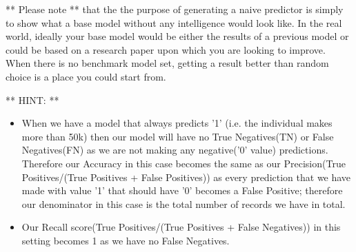 \documentclass[11pt]{article}
\providecommand{\tightlist}{%
      \setlength{\itemsep}{0pt}\setlength{\parskip}{0pt}}
\begin{document}
** Please note ** that the the purpose of generating a naive predictor
is simply to show what a base model without any intelligence would look
like. In the real world, ideally your base model would be either the
results of a previous model or could be based on a research paper upon
which you are looking to improve. When there is no benchmark model set,
getting a result better than random choice is a place you could start
from.

** HINT: **

\begin{itemize}
\tightlist
\item
  When we have a model that always predicts '1' (i.e. the individual
  makes more than 50k) then our model will have no True Negatives(TN) or
  False Negatives(FN) as we are not making any negative('0' value)
  predictions. Therefore our Accuracy in this case becomes the same as
  our Precision(True Positives/(True Positives + False Positives)) as
  every prediction that we have made with value '1' that should have '0'
  becomes a False Positive; therefore our denominator in this case is
  the total number of records we have in total.
\item
  Our Recall score(True Positives/(True Positives + False Negatives)) in
  this setting becomes 1 as we have no False Negatives.
\end{itemize}
\end{document}
